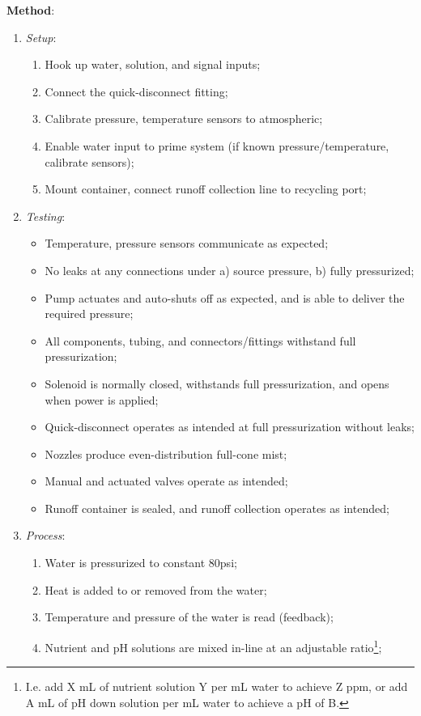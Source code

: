 \textbf{Method}:
\begin{enumerate}
    \item \textit{Setup}:
    \begin{enumerate}
        \item Hook up water, solution, and signal inputs;
        \item Connect the quick-disconnect fitting;
        \item Calibrate pressure, temperature sensors to atmospheric;
        \item Enable water input to prime system (if known pressure/temperature, calibrate sensors);
        \item Mount container, connect runoff collection line to recycling port;
    \end{enumerate}
\newpage
    \item \textit{Testing}:
    \begin{itemize}
        \item Temperature, pressure sensors communicate as expected;
        \item No leaks at any connections under a) source pressure, b) fully pressurized;
        \item Pump actuates and auto-shuts off as expected, and is able to deliver the required pressure;
        \item All components, tubing, and connectors/fittings withstand full pressurization;
        \item Solenoid is normally closed, withstands full pressurization, and opens when power is applied;
        \item Quick-disconnect operates as intended at full pressurization without leaks;
        \item Nozzles produce even-distribution full-cone mist;
        \item Manual and actuated valves operate as intended;
        \item Runoff container is sealed, and runoff collection operates as intended;
    \end{itemize}
    \item \textit{Process}:
    \begin{enumerate}
        \item Water is pressurized to constant 80psi;
        \item Heat is added to or removed from the water;
        \item Temperature and pressure of the water is read (feedback);
        \item Nutrient and pH solutions are mixed in-line at an adjustable ratio\footnote{I.e. add X mL of nutrient solution Y per mL water to achieve Z ppm, or add A mL of pH down solution per mL water to achieve a pH of B.};

\end{enumerate}
\end{enumerate}
